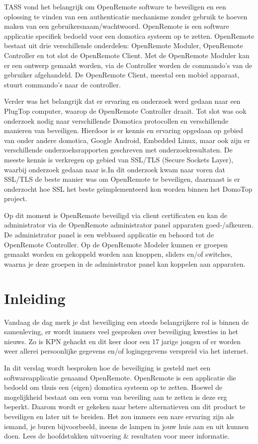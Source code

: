\documentclass[]{article}
\begin{document}
TASS vond het belangrijk om OpenRemote software te beveiligen en een oplossing
te vinden van een authenticatie mechanisme zonder gebruik te hoeven maken van
een gebruikersnaam/wachtwoord. OpenRemote is een software
applicatie specifiek bedoeld voor een domotica systeem op te zetten. OpenRemote
bestaat uit drie verschillende onderdelen: OpenRemote Moduler, OpenRemote
Controller en tot slot de OpenRemote Client. Met de OpenRemote Moduler kan er een ontwerp
gemaakt worden, via de Controller worden de commando's van de gebruiker
afgehandeld. De OpenRemote Client, meestal een mobiel apparaat, stuurt
commando's naar de controller.

Verder was het belangrijk dat er ervaring en onderzoek werd gedaan naar een PlugTop computer, waarop de OpenRemote Controller
draait. Tot slot was ook onderzoek nodig naar verschillende Domotica
protocollen en verschillende manieren van beveiligen. Hierdoor is er kennis en
ervaring opgedaan op gebied van onder andere domotica, Google Android, Embedded
Linux, maar ook zijn er verschillende onderzoeksrapporten geschreven met
onderzoekresultaten. De meeste kennis is verkregen op gebied van SSL/TLS (Secure Sockets Layer),
waarbij onderzoek gedaan naar is.In dit onderzoek kwam naar voren dat SSL/TLS
de beste manier was om OpenRemote te beveiligen, daarnaast is er onderzocht hoe
SSL het beste ge\"implementeerd kon worden binnen het DomoTop project. 

Op dit moment is OpenRemote beveiligd via client certificaten en kan de
administrator via de OpenRemote administrator panel apparaten goed-/afkeuren. De
administrator panel is een webbased applicatie en behoord tot de OpenRemote
Controller. Op de OpenRemote Modeler kunnen er groepen gemaakt worden en
gekoppeld worden aan knoppen, sliders en/of switches, waarna je deze groepen in
de administrator panel kan koppelen aan apparaten.

\newpage
\section{Inleiding}
Vandaag de dag merk je dat beveiliging een steeds belangrijkere rol is binnen
de samenleving, er wordt immers veel gesproken over beveiliging kwesties in
het nieuws. Zo is KPN gehackt en dit keer door een 17 jarige jongen of
er worden weer allerei persoonlijke gegevens en/of logingegevens verspreid via het
internet.

In dit verslag wordt besproken hoe de beveiliging is gesteld met een
softwareapplicatie genaamd OpenRemote. OpenRemote is een applicatie die
bedoeld om thuis een (eigen) domotica systeem op te zetten. Hoewel de mogelijkheid 
bestaat om een vorm van beveiling aan te zetten is deze erg beperkt. Daarom wordt er gekeken naar betere
alternatieven om dit product te beveiligen en later uit te breiden. Het zou
immers een nare ervaring zijn als iemand, je buren bijvoorbeeld, ineens de lampen in jouw huis aan en uit
kunnen doen. Lees de hoofdstukken uitvoering \& resultaten voor meer informatie.
\end{document}
